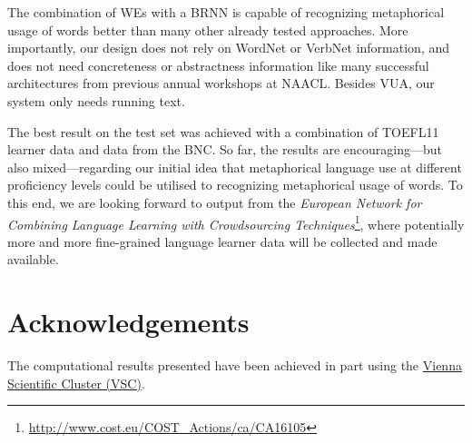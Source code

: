 \documentclass[11pt,a4paper]{article}
\begin{document}
The combination of WEs with a BRNN is capable of recognizing metaphorical usage of words better than many other already tested approaches.
More importantly, our design does not rely on WordNet or VerbNet information, and does not need concreteness or abstractness information like many successful architectures from previous annual workshops at NAACL. 
Besides VUA, our system only needs running text.

The best result on the test set was achieved with a combination of TOEFL11 learner data and data from the BNC. 
So far, the results are encouraging---but also mixed---regarding our initial idea that metaphorical language use at different proficiency levels could be utilised to recognizing metaphorical usage of words. 
To this end, we are looking forward to output from the \emph{European Network for Combining Language Learning with Crowdsourcing Techniques}\footnote{\url{http://www.cost.eu/COST_Actions/ca/CA16105}}, where potentially more and more fine-grained language learner data will be collected and made available.

\section*{Acknowledgements} %
The computational results presented have been achieved in part using the \href{http://vsc.ac.at}{Vienna
Scientific Cluster (VSC)}.

\medskip



\end{document}
